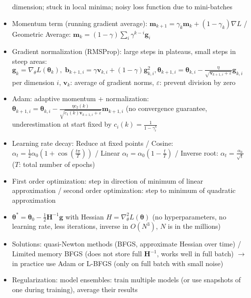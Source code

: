 \documentclass[11pt]{scrartcl}
\begin{document}
\begin{itemize}
        dimension; stuck in local minima; noisy loss function due to mini-batches
    \item Momentum term (running gradient average): \( \bm{m}_{k + 1} = 
        \gamma_k \bm{m}_k + ( 1 - \gamma_k ) \nabla L \) / Geometric Average: 
        \( \bm{m}_k = ( 1 - \gamma ) \sum_i \gamma^{k - i} \bm{g}_i \)
    \item Gradient normalization (RMSProp): large steps in plateaus, small steps in steep 
        areas: \( \bm{g}_k = \nabla_\theta L ( \bm{\theta}_k ), \; \bm{b}_{k + 1, i} = 
        \gamma \bm{v}_{k, i} + ( 1 - \gamma ) \bm{g}_{k, i}^2, \bm{\theta}_{k + 1, i} = 
        \bm{\theta}_{k, i} - \frac{\eta}{\sqrt{\bm{v}_{k + 1, i} + \varepsilon}} 
        \bm{g}_{k, i} \) per dimension \( i \), \( \bm{v}_k \): average of gradient norms, 
        \( \varepsilon \): prevent division by zero
    \item Adam: adaptive momentum + normalization: \( \bm{\theta}_{k + 1, i} = 
        \bm{\theta}_{k, i} - \frac{\eta c_2 ( k )}{\sqrt{c_1 ( k ) \bm{v}_{k + 1, i} + 
        \varepsilon}} \bm{m}_{k + 1, i} \) (no convergence guarantee, underestimation at start 
        fixed by \( c_i ( k ) = \frac{1}{1 - \gamma_i^k} \)
    \item Learning rate decay: Reduce at fixed points / Cosine: \( \alpha_t = 
        \frac{1}{2} \alpha_0 ( 1 + \cos ( \frac{t \pi}{T} ) ) \) / Linear \( \alpha_t = 
        \alpha_0 ( 1 - \frac{t}{T} ) \) / Inverse root: \( \alpha_t = 
        \frac{\alpha_0}{\sqrt{t}} \) (\( T \): total number of epochs)
    \item First order optimization: step in direction of minimum of linear approximation / 
        second order optimization: step to minimum of quadratic approximation
    \item \( \bm{\theta}^* = \bm{\theta}_0 - \frac{1}{2} \bm{H}^{- 1} \bm{g} \) with Hessian 
        \( H = \nabla_\theta^2 L ( \bm{\theta} ) \) (no hyperparameters, no learning rate, 
        less iterations, inverse in \( O ( N^3 ) \), \( N \) is in the millions)
    \item Solutions: quasi-Newton methods (BFGS, approximate Hessian over time) / Limited 
        memory BFGS (does not store full \( \bm{H}^{- 1} \), works well in full batch) 
        \( \rightarrow \) in practice use Adam or L-BFGS (only on full batch with small noise)
    \item Regularization: model ensembles: train multiple models (or use snapshots of one 
        during training), average their results

\end{itemize}
\end{document}
